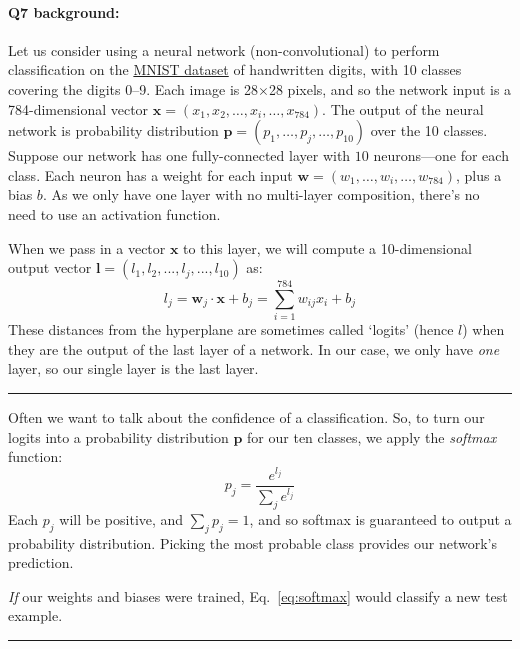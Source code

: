 \paragraph{Q7 background:}
Let us consider using a neural network (non-convolutional) to perform classification on the \href{http://yann.lecun.com/exdb/mnist/}{MNIST dataset} of handwritten digits, with 10 classes covering the digits 0--9. Each image is 28$\times$28 pixels, and so the network input is a 784-dimensional vector $\mathbf{x}=(x_1,x_2,\dots,x_i,\dots,x_{784})$. The output of the neural network is probability distribution $\mathbf{p}=(p_1,\dots,p_j,\dots,p_{10})$ over the 10 classes. Suppose our network has one fully-connected layer with $10$ neurons---one for each class. Each neuron has a weight for each input $\mathbf{w}=(w_1,\dots,w_i,\dots,w_{784})$, plus a bias $b$. As we only have one layer with no multi-layer composition, there's no need to use an activation function.

When we pass in a vector $\mathbf{x}$ to this layer, we will compute a 10-dimensional output vector $\mathbf{l}=(l_1,l_2,...,l_j,...,l_{10})$ as:
\begin{equation}
    l_j = \mathbf{w}_j \cdot \mathbf{x} + b_j = \sum_{i=1}^{784}w_{ij}x_i + b_j
\end{equation}
These distances from the hyperplane are sometimes called `logits' (hence $l$) when they are the output of the last layer of a network. In our case, we only have \emph{one} layer, so our single layer is the last layer.

\hspace{\fill}\rule{0.5\linewidth}{.5pt}\hspace{\fill}

Often we want to talk about the confidence of a classification. So, to turn our logits into a probability distribution $\mathbf{p}$ for our ten classes, we apply the \emph{softmax} function:
\begin{equation}
    p_j = \frac{e^{l_j}}{\sum_je^{l_j}}
   \label{eq:softmax}
\end{equation}
Each $p_j$ will be positive, and $\sum_jp_j = 1$, and so softmax is guaranteed to output a probability distribution. Picking the most probable class provides our network's prediction.

\emph{If} our weights and biases were trained, Eq.~\ref{eq:softmax} would classify a new test example.

\hspace{\fill}\rule{0.5\linewidth}{.5pt}\hspace{\fill}

